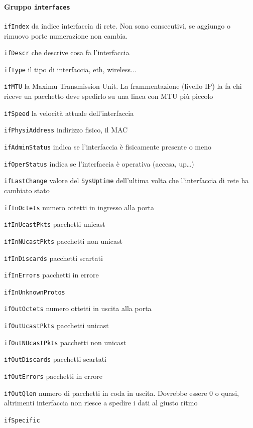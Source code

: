 \documentclass[10pt]{book}
\begin{document}
\paragraph{Gruppo \texttt{interfaces}}\begin{list}{}{Informazioni sulle interfacce di rete}
	\item \texttt{ifIndex} da indice interfaccia di rete. Non sono consecutivi, se aggiungo o rimuovo porte numerazione non cambia.
	\item \texttt{ifDescr} che descrive cosa fa l'interfaccia 
	\item \texttt{ifType} il tipo di interfaccia, eth, wireless...
	\item \texttt{ifMTU} la Maximu Transmission Unit. La frammentazione (livello IP) la fa chi riceve un pacchetto deve spedirlo su una linea con MTU più piccolo
	\item \texttt{ifSpeed} la velocità attuale dell'interfaccia
	\item \texttt{ifPhysiAddress} indirizzo fisico, il MAC
	\item \texttt{ifAdminStatus} indica se l'interfaccia è fisicamente presente o meno
	\item \texttt{ifOperStatus} indica se l'interfaccia è operativa (accesa, up\ldots)
	\item \texttt{ifLastChange} valore del \texttt{SysUptime} dell'ultima volta che l'interfaccia di rete ha cambiato stato
	\item \texttt{ifInOctets} numero ottetti in ingresso alla porta
	\item \texttt{ifInUcastPkts} pacchetti unicast
	\item \texttt{ifInNUcastPkts} pacchetti non unicast
	\item \texttt{ifInDiscards} pacchetti scartati
	\item \texttt{ifInErrors} pacchetti in errore
	\item \texttt{ifInUnknownProtos}
	\item \texttt{ifOutOctets} numero ottetti in uscita alla porta
	\item \texttt{ifOutUcastPkts} pacchetti unicast
	\item \texttt{ifOutNUcastPkts} pacchetti non unicast
	\item \texttt{ifOutDiscards} pacchetti scartati
	\item \texttt{ifOutErrors} pacchetti in errore
	\item \texttt{ifOutQlen} numero di pacchetti in coda in uscita. Dovrebbe essere 0 o quasi, altrimenti interfaccia non riesce a spedire i dati al giusto ritmo
	\item \texttt{ifSpecific}
\end{list}
\end{document}
